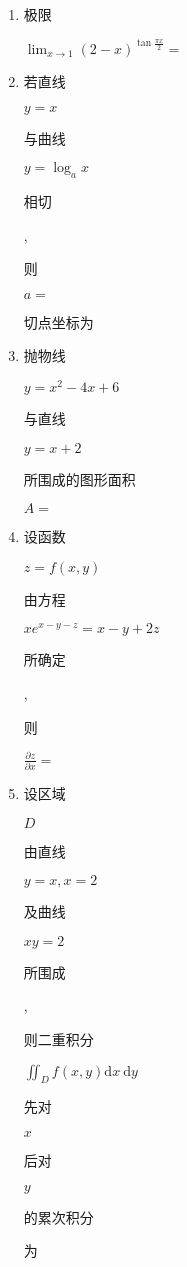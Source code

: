 \documentclass[10pt]{article}
\begin{document}
\begin{enumerate}
  \item \begin{CJK}{UTF8}{mj}极限\end{CJK} $\lim _{x \rightarrow 1}(2-x)^{\tan \frac{\pi x}{2}}=$

  \item \begin{CJK}{UTF8}{mj}若直线\end{CJK} $y=x$ \begin{CJK}{UTF8}{mj}与曲线\end{CJK} $y=\log _{a} x$ \begin{CJK}{UTF8}{mj}相切\end{CJK}, \begin{CJK}{UTF8}{mj}则\end{CJK} $a=$ \begin{CJK}{UTF8}{mj}切点坐标为\end{CJK}

  \item \begin{CJK}{UTF8}{mj}抛物线\end{CJK} $y=x^{2}-4 x+6$ \begin{CJK}{UTF8}{mj}与直线\end{CJK} $y=x+2$ \begin{CJK}{UTF8}{mj}所围成的图形面积\end{CJK} $A=$

  \item \begin{CJK}{UTF8}{mj}设函数\end{CJK} $z=f(x, y)$ \begin{CJK}{UTF8}{mj}由方程\end{CJK} $x e^{x-y-z}=x-y+2 z$ \begin{CJK}{UTF8}{mj}所确定\end{CJK}, \begin{CJK}{UTF8}{mj}则\end{CJK} $\frac{\partial z}{\partial x}=$

  \item \begin{CJK}{UTF8}{mj}设区域\end{CJK} $D$ \begin{CJK}{UTF8}{mj}由直线\end{CJK} $y=x, x=2$ \begin{CJK}{UTF8}{mj}及曲线\end{CJK} $x y=2$ \begin{CJK}{UTF8}{mj}所围成\end{CJK}, \begin{CJK}{UTF8}{mj}则二重积分\end{CJK} $\iint_{D} f(x, y) \mathrm{d} x \mathrm{~d} y$ \begin{CJK}{UTF8}{mj}先对\end{CJK} $x$ \begin{CJK}{UTF8}{mj}后对\end{CJK} $y$ \begin{CJK}{UTF8}{mj}的累次积分\end{CJK} \begin{CJK}{UTF8}{mj}为\end{CJK}

\end{enumerate}
\end{document}

